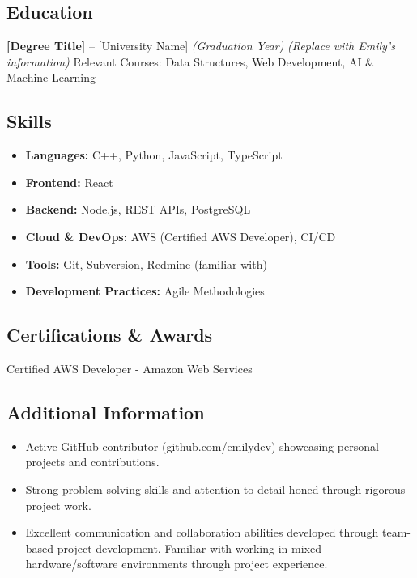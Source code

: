 \documentclass[
]{article}
\providecommand{\tightlist}{%
  \setlength{\itemsep}{0pt}\setlength{\parskip}{0pt}}
\begin{document}
\subsection{\texorpdfstring{\textbf{Education}}{Education}}\label{education}

\textbf{{[}Degree Title{]}} -- {[}University Name{]} \emph{(Graduation
Year)} \emph{(Replace with Emily's information)} Relevant Courses: Data
Structures, Web Development, AI \& Machine Learning

\subsection{\texorpdfstring{\textbf{Skills}}{Skills}}\label{skills}

\begin{itemize}
\tightlist
\item
  \textbf{Languages:} C++, Python, JavaScript, TypeScript
\item
  \textbf{Frontend:} React
\item
  \textbf{Backend:} Node.js, REST APIs, PostgreSQL
\item
  \textbf{Cloud \& DevOps:} AWS (Certified AWS Developer), CI/CD
\item
  \textbf{Tools:} Git, Subversion, Redmine (familiar with)
\item
  \textbf{Development Practices:} Agile Methodologies
\end{itemize}

\subsection{\texorpdfstring{\textbf{Certifications \&
Awards}}{Certifications \& Awards}}\label{certifications-awards}

Certified AWS Developer - Amazon Web Services

\subsection{\texorpdfstring{\textbf{Additional
Information}}{Additional Information}}\label{additional-information}

\begin{itemize}
\tightlist
\item
  Active GitHub contributor (github.com/emilydev) showcasing personal
  projects and contributions.
\item
  Strong problem-solving skills and attention to detail honed through
  rigorous project work.
\item
  Excellent communication and collaboration abilities developed through
  team-based project development. Familiar with working in mixed
  hardware/software environments through project experience.
\end{itemize}
\end{document}
